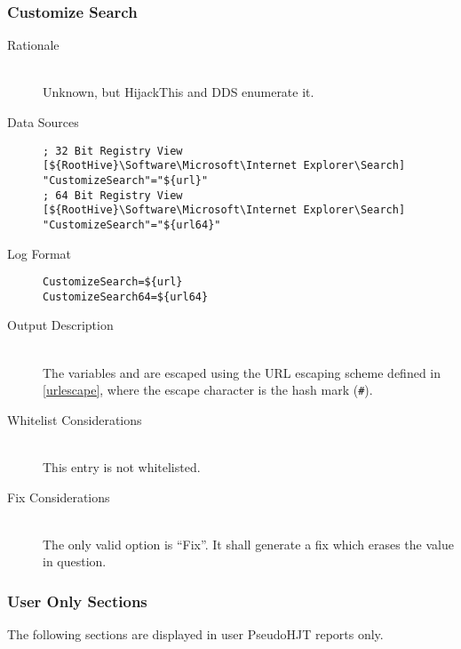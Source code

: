 \subsubsection{Customize Search}
\begin{description}
\item[Rationale] \hfill \\
Unknown, but HijackThis and DDS enumerate it.

\item[Data Sources] \hfill
\vspace{-\baselineskip}
\begin{verbatim}
; 32 Bit Registry View
[${RootHive}\Software\Microsoft\Internet Explorer\Search]
"CustomizeSearch"="${url}"
; 64 Bit Registry View
[${RootHive}\Software\Microsoft\Internet Explorer\Search]
"CustomizeSearch"="${url64}"
\end{verbatim}
\item[Log Format] \hfill
\vspace{-\baselineskip}
\begin{verbatim}
CustomizeSearch=${url}
CustomizeSearch64=${url64}
\end{verbatim}
\item[Output Description] \hfill \\
The variables  and  are escaped using the URL escaping
scheme defined in \ref{urlescape}, where the escape character is the hash mark
(\verb|#|).
\item[Whitelist Considerations] \hfill \\
This entry is not whitelisted.
\item[Fix Considerations] \hfill \\
The only valid option is ``Fix''. It shall generate a fix which erases the value
in question.
\end{description}

\subsubsection{User Only Sections}
The following sections are displayed in user PseudoHJT reports only.

